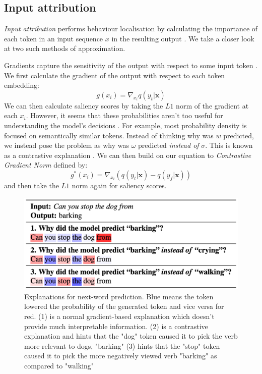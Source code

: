 \subsection{Input attribution}
\textit{Input attribution} performs behaviour localisation by calculating the importance of each token in an input sequence $x$ in the resulting output \cite{ferrando_primer_2024}. We take a closer look at two such methods of approximation.

Gradients capture the sensitivity of the output with respect to some input token \cite{denil_extraction_2014}. We first calculate the gradient of the output with respect to each token embedding:
$$g(x_i)=\nabla_{x_i}q(y_t|\bm{x})$$
We can then calculate saliency scores by taking the $L1$ norm of the gradient at each $x_i$. However, it seems that these probabilities aren't too useful for understanding the model's decisions \cite{holtzman_surface_2021}. For example, most probability density is focused on semantically similar tokens. Instead of thinking why was $w$ predicted, we instead pose the problem as why was $\omega$ predicted \textit{instead of} $\sigma$. This is known as a contrastive explanation \cite{yin_interpreting_2022}. We can then build on our equation to \textit{Contrastive Gradient Norm} defined by:
$$g^*(x_i)=\nabla_{x_i}(q(y_t|\bm{x})-q(y_f|\bm{x}))$$ and then take the $L1$ norm again for saliency scores.

\begin{figure}[ht]
    \centering
    \includegraphics[width=0.75\linewidth]{contgrad.png}
    \caption{Explanations for next-word prediction. Blue means the token lowered the probability of the generated token and vice versa for red. (1) is a normal gradient-based explanation which doesn't provide much interpretable information. (2) is a contrastive explanation and hints that the "dog" token caused it to pick the verb more relevant to dogs, "barking" (3) hints that the "stop" token caused it to pick the more negatively viewed verb "barking" as compared to "walking"}
    \label{fig:enter-label}
\end{figure}

